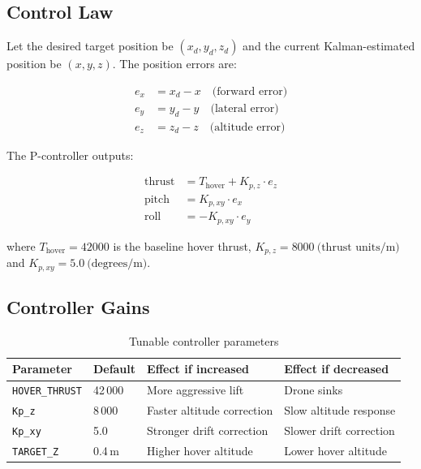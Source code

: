 \documentclass[11pt,a4paper]{article}
\begin{document}
\subsection{Control Law}

Let the desired target position be $(x_d, y_d, z_d)$ and the current Kalman-estimated position be $(x, y, z)$. The position errors are:

\begin{align}
e_x &= x_d - x \quad \text{(forward error)}\\
e_y &= y_d - y \quad \text{(lateral error)}\\
e_z &= z_d - z \quad \text{(altitude error)}
\end{align}

The P-controller outputs:

\begin{align}
\text{thrust} &= T_{\text{hover}} + K_{p,z} \cdot e_z \\
\text{pitch}  &= K_{p,xy} \cdot e_x \\
\text{roll}   &= -K_{p,xy} \cdot e_y
\end{align}

where $T_{\text{hover}} = 42000$ is the baseline hover thrust, $K_{p,z} = 8000\ \text{(thrust units/m)}$ and $K_{p,xy} = 5.0\ \text{(degrees/m)}$.

\subsection{Controller Gains}

\begin{table}[h!]
\centering
\caption{Tunable controller parameters}
\vspace{0.3em}
\begin{tabular}{@{}llll@{}}
\toprule
\textbf{Parameter} & \textbf{Default} & \textbf{Effect if increased} & \textbf{Effect if decreased} \\ \midrule
\texttt{HOVER\_THRUST}  & 42\,000     & More aggressive lift    & Drone sinks \\
\texttt{Kp\_z}          & 8\,000      & Faster altitude correction & Slow altitude response \\
\texttt{Kp\_xy}         & 5.0         & Stronger drift correction  & Slower drift correction \\
\texttt{TARGET\_Z}      & 0.4\,m      & Higher hover altitude  & Lower hover altitude \\ \bottomrule
\end{tabular}
\end{table}
\end{document}
